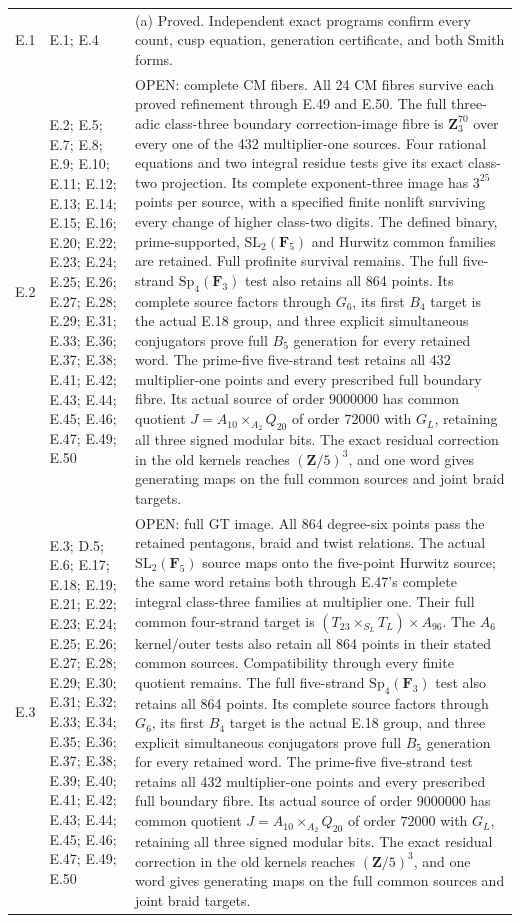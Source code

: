\begin{longtable}{@{}p{1.1cm}p{3.0cm}p{10.3cm}@{}}
E.1 & E.1; E.4 & (a) Proved. Independent exact programs confirm every count, cusp equation, generation certificate, and both Smith forms. \\
E.2 & E.2; E.5; E.7; E.8; E.9; E.10; E.11; E.12; E.13; E.14; E.15; E.16; E.20; E.22; E.23; E.24; E.25; E.26; E.27; E.28; E.29; E.31; E.33; E.36; E.37; E.38; E.41; E.42; E.43; E.44; E.45; E.46; E.47; E.49; E.50 & OPEN: complete CM fibers. All 24 CM fibres survive each proved refinement through E.49 and E.50. The full three-adic class-three boundary correction-image fibre is $\mathbf Z_3^{70}$ over every one of the 432 multiplier-one sources. Four rational equations and two integral residue tests give its exact class-two projection. Its complete exponent-three image has $3^{25}$ points per source, with a specified finite nonlift surviving every change of higher class-two digits. The defined binary, prime-supported, $\mathrm{SL}_2(\mathbf F_5)$ and Hurwitz common families are retained. Full profinite survival remains. The full five-strand $\mathrm{Sp}_4(\mathbf F_3)$ test also retains all 864 points. Its complete source factors through $G_6$, its first $B_4$ target is the actual E.18 group, and three explicit simultaneous conjugators prove full $B_5$ generation for every retained word. The prime-five five-strand test retains all 432 multiplier-one points and every prescribed full boundary fibre. Its actual source of order $9000000$ has common quotient $J=A_{10}\times_{A_2}Q_{20}$ of order $72000$ with $G_L$, retaining all three signed modular bits. The exact residual correction in the old kernels reaches $(\mathbf Z/5)^3$, and one word gives generating maps on the full common sources and joint braid targets. \\
E.3 & E.3; D.5; E.6; E.17; E.18; E.19; E.21; E.22; E.23; E.24; E.25; E.26; E.27; E.28; E.29; E.30; E.31; E.32; E.33; E.34; E.35; E.36; E.37; E.38; E.39; E.40; E.41; E.42; E.43; E.44; E.45; E.46; E.47; E.49; E.50 & OPEN: full GT image. All 864 degree-six points pass the retained pentagons, braid and twist relations. The actual $\mathrm{SL}_2(\mathbf F_5)$ source maps onto the five-point Hurwitz source; the same word retains both through E.47's complete integral class-three families at multiplier one. Their full common four-strand target is $(T_{23}\times_{S_L}T_L)\times A_{96}$. The $A_6$ kernel/outer tests also retain all 864 points in their stated common sources. Compatibility through every finite quotient remains. The full five-strand $\mathrm{Sp}_4(\mathbf F_3)$ test also retains all 864 points. Its complete source factors through $G_6$, its first $B_4$ target is the actual E.18 group, and three explicit simultaneous conjugators prove full $B_5$ generation for every retained word. The prime-five five-strand test retains all 432 multiplier-one points and every prescribed full boundary fibre. Its actual source of order $9000000$ has common quotient $J=A_{10}\times_{A_2}Q_{20}$ of order $72000$ with $G_L$, retaining all three signed modular bits. The exact residual correction in the old kernels reaches $(\mathbf Z/5)^3$, and one word gives generating maps on the full common sources and joint braid targets. \\

\end{longtable}
